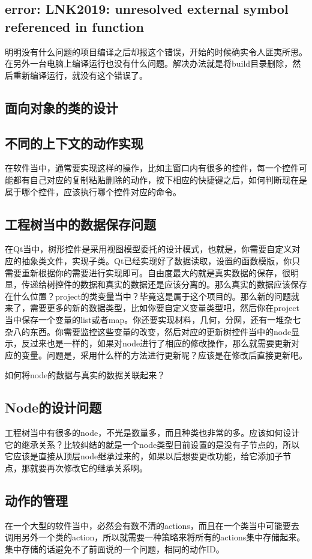 \subsection{error: LNK2019: unresolved external symbol referenced in function}

明明没有什么问题的项目编译之后却报这个错误，开始的时候确实令人匪夷所思。在另外一台电脑上编译运行也没有什么问题。解决办法就是将build目录删除，然后重新编译运行，就没有这个错误了。

\subsection{面向对象的类的设计}

\subsection{不同的上下文的动作实现}
在软件当中，通常要实现这样的操作，比如主窗口内有很多的控件，每一个控件可能都有自己对应的复制粘贴删除的动作，按下相应的快捷键之后，如何判断现在是属于哪个控件，应该执行哪个控件对应的命令。

\subsection{工程树当中的数据保存问题}
在Qt当中，树形控件是采用视图模型委托的设计模式，也就是，你需要自定义对应的抽象类文件，实现子类。Qt已经实现好了数据读取，设置的函数模版，你只需要重新根据你的需要进行实现即可。自由度最大的就是真实数据的保存，很明显，传递给树控件的数据和真实的数据还是应该分离的。那么真实的数据应该保存在什么位置？project的类变量当中？毕竟这是属于这个项目的。那么新的问题就来了，需要更多的新的数据类型，比如你要自定义变量类型吧，然后你在project当中保存一个变量的list或者map。你还要实现材料，几何，分网，还有一堆杂七杂八的东西。你需要监控这些变量的改变，然后对应的更新树控件当中的node显示，反过来也是一样的，如果对node进行了相应的修改操作，那么就需要更新对应的变量。问题是，采用什么样的方法进行更新呢？应该是在修改后直接更新吧。

如何将node的数据与真实的数据关联起来？
\subsection{Node的设计问题}
工程树当中有很多的node，不光是数量多，而且种类也非常的多。应该如何设计它的继承关系？比较纠结的就是一个node类型目前设置的是没有子节点的，所以它应该是直接从顶层node继承过来的，如果以后想要更改功能，给它添加子节点，那就要再次修改它的继承关系啊。
\subsection{动作的管理}
在一个大型的软件当中，必然会有数不清的actions，而且在一个类当中可能要去调用另外一个类的action，所以就需要一种策略来将所有的actions集中存储起来。集中存储的话避免不了前面说的一个问题，相同的动作ID。

